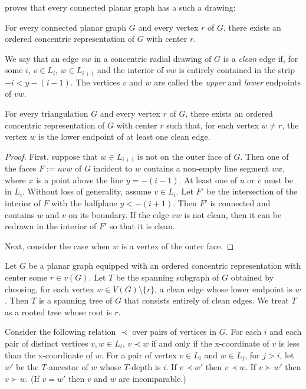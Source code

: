 \documentclass{patmorin}
\newcommand{\defin}[1]{\emph{\textcolor{brightmaroon}{#1}}}
\begin{document}
\citet{pupyrev:mixed} proves that every connected planar graph has a such a drawing:

\begin{lem}\label{pupyrev}
  For every connected planar graph $G$ and every vertex $r$ of $G$, there exists an ordered concentric representation of $G$ with center $r$.
\end{lem}

We say that an edge $vw$ in a concentric radial drawing of $G$ is a \defin{clean} edge if, for some $i$, $v\in L_i$, $w\in L_{i+1}$ and the interior of $vw$ is entirely contained in the strip $-i < y -(i-1)$.  The vertices $v$ and $w$ are called the \defin{upper} and \defin{lower} endpoints of $vw$.

\begin{lem}\label{clean_edge}
  For every triangulation $G$ and every vertex $r$ of $G$, there exists an ordered concentric representation of $G$ with center $r$ such that, for each vertex $w\neq r$, the vertex $w$ is the lower endpoint of at least one clean edge.
\end{lem}

\begin{proof}
  First, suppose that $w\in L_{i+1}$ is not on the outer face of $G$.  Then one of the faces $F:=uvw$ of $G$ incident to $w$ contains a non-empty line segment $wx$, where $x$ is a point above the line $y=-(i-1)$. At least one of $u$ or $v$ must be in $L_{i}$.  Without loss of generality, assume $v\in L_i$. Let $F'$ be the intersection of the interior of $F$ with the halfplane $y<-(i+1)$. Then $F'$ is connected and contains $w$ and $v$ on its boundary.  If the edge $vw$ is not clean, then it can be redrawn in the interior of $F'$ so that it is clean.

  Next, consider the case when $w$ is a vertex of the outer face.
\end{proof}

Let $G$ be a planar graph equipped with an ordered concentric representation with center some $r\in v(G)$. Let $T$ be the spanning subgraph of $G$ obtained by choosing, for each vertex $w\in V(G)\setminus\{r\}$, a clean edge whose lower endpoint is $w$.  Then $T$ is a spanning tree of $G$ that consists entirely of clean edges.  We treat $T$ as a rooted tree whose root is $r$.

Consider the following relation $\prec$ over pairs of vertices in $G$. For each $i$ and each pair of distinct vertices $v,w\in L_i$, $v\prec w$ if and only if the x-coordinate of $v$ is less than the x-coordinate of $w$.  For a pair of vertex $v\in L_i$ and $w\in L_j$, for $j>i$, let $w'$ be the $T$-ancestor of $w$ whose $T$-depth is $i$.  If $v\prec w'$ then $v\prec w$. If $v\succ w'$ then $v\succ w$. (If $v=w'$ then $v$ and $w$ are incomparable.)
\end{document}
